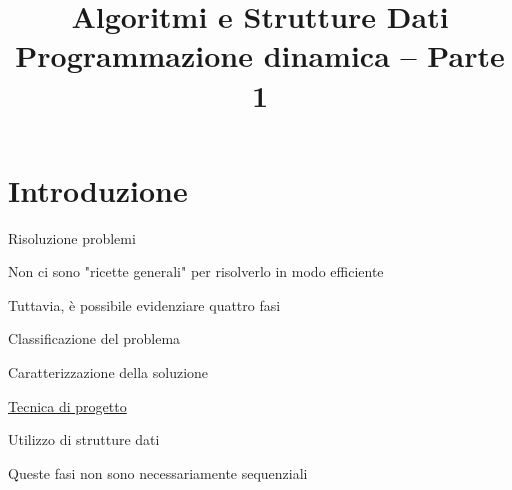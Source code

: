 

\usepackage{epigraph}
\usepackage[normalem]{ulem}
\usepackage{xcolor}
\usepackage{colortbl}
\usepackage{tikz}
\usepackage[normalem]{ulem}
\usepackage[absolute,overlay]{textpos}
\usetikzlibrary{trees}
\usetikzlibrary{shapes}
\usetikzlibrary{positioning}

\setlength{\epigraphwidth}{6cm}

\usepackage{xmpmulti}
\usepackage{listings}


\newcommand*\circled[1]{\tikz[baseline=(char.base)]{
      \node[circle,ball color=blue, shade, 
 color=white,inner sep=1.2pt] (char) {\tiny #1};}}


\title[ASD - Programmazione Dinamica]{\textbf{Algoritmi e Strutture Dati}\\[24pt]Programmazione dinamica -- Parte 1}

\graphicspath{{figs/13/}}





\FrameTitle{}

\FrameContent


\section{Introduzione}

\begin{frame}{Risoluzione problemi}

\BIL
\item Non ci sono "ricette generali" per risolverlo in modo efficiente
\item Tuttavia, è possibile evidenziare quattro fasi
\BI
\item \alert{Classificazione del problema}
\item \alert{Caratterizzazione della soluzione}
\item \underline{\alert{Tecnica di progetto}}
\item \alert{Utilizzo di strutture dati}
\EI
\item Queste fasi non sono necessariamente sequenziali
\EIL

\end{frame}


